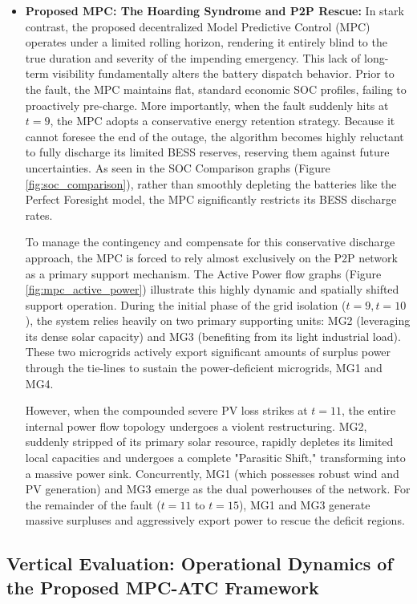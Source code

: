 \begin{itemize}
    \item \textbf{Proposed MPC: The Hoarding Syndrome and P2P Rescue:}
In stark contrast, the proposed decentralized Model Predictive Control (MPC) operates under a limited rolling horizon, rendering it entirely blind to the true duration and severity of the impending emergency. This lack of long-term visibility fundamentally alters the battery dispatch behavior. Prior to the fault, the MPC maintains flat, standard economic SOC profiles, failing to proactively pre-charge. More importantly, when the fault suddenly hits at $t=9$, the MPC adopts a conservative energy retention strategy. Because it cannot foresee the end of the outage, the algorithm becomes highly reluctant to fully discharge its limited BESS reserves, reserving them against future uncertainties. As seen in the SOC Comparison graphs (Figure \ref{fig:soc_comparison}), rather than smoothly depleting the batteries like the Perfect Foresight model, the MPC significantly restricts its BESS discharge rates. 

To manage the contingency and compensate for this conservative discharge approach, the MPC is forced to rely almost exclusively on the P2P network as a primary support mechanism. The Active Power flow graphs (Figure \ref{fig:mpc_active_power}) illustrate this highly dynamic and spatially shifted support operation. During the initial phase of the grid isolation ($t=9, t=10$), the system relies heavily on two primary supporting units: MG2 (leveraging its dense solar capacity) and MG3 (benefiting from its light industrial load). These two microgrids actively export significant amounts of surplus power through the tie-lines to sustain the power-deficient microgrids, MG1 and MG4. 

However, when the compounded severe PV loss strikes at $t=11$, the entire internal power flow topology undergoes a violent restructuring. MG2, suddenly stripped of its primary solar resource, rapidly depletes its limited local capacities and undergoes a complete "Parasitic Shift," transforming into a massive power sink. Concurrently, MG1 (which possesses robust wind and PV generation) and MG3 emerge as the dual powerhouses of the network. For the remainder of the fault ($t=11$ to $t=15$), MG1 and MG3 generate massive surpluses and aggressively export power to rescue the deficit regions. 
\end{itemize}

\subsection{Vertical Evaluation: Operational Dynamics of the Proposed MPC-ATC Framework}

